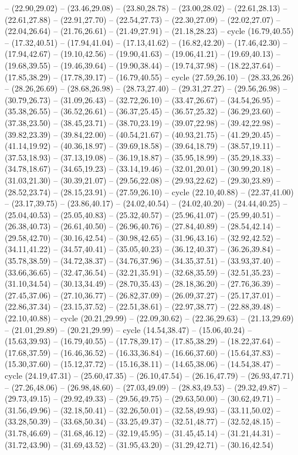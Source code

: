 {-- (22.90,29.02) -- (23.46,29.08) -- (23.80,28.78) -- (23.00,28.02) -- (22.61,28.13) -- (22.61,27.88) -- (22.91,27.70) -- (22.54,27.73) -- (22.30,27.09) -- (22.02,27.07) -- (22.04,26.64) -- (21.76,26.61) -- (21.49,27.91) -- (21.18,28.23) -- cycle (16.79,40.55) -- (17.32,40.51) -- (17.94,41.04) -- (17.13,41.62) -- (16.82,42.20) -- (17.46,42.30) -- (17.94,42.67) -- (19.10,42.56) -- (19.90,41.63) -- (19.06,41.21) -- (19.69,40.13) -- (19.68,39.55) -- (19.46,39.64) -- (19.90,38.44) -- (19.74,37.98) -- (18.22,37.64) -- (17.85,38.29) -- (17.78,39.17) -- (16.79,40.55) -- cycle (27.59,26.10) -- (28.33,26.26) -- (28.26,26.69) -- (28.68,26.98) -- (28.73,27.40) -- (29.31,27.27) -- (29.56,26.98) -- (30.79,26.73) -- (31.09,26.43) -- (32.72,26.10) -- (33.47,26.67) -- (34.54,26.95) -- (35.38,26.55) -- (36.52,26.61) -- (36.37,25.45) -- (36.57,25.32) -- (36.29,23.60) -- (37.38,23.50) -- (38.45,23.71) -- (38.70,23.19) -- (39.07,22.98) -- (39.42,22.98) -- (39.82,23.39) -- (39.84,22.00) -- (40.54,21.67) -- (40.93,21.75) -- (41.29,20.45) -- (41.14,19.92) -- (40.36,18.97) -- (39.69,18.58) -- (39.64,18.79) -- (38.57,19.11) -- (37.53,18.93) -- (37.13,19.08) -- (36.19,18.87) -- (35.95,18.99) -- (35.29,18.33) -- (34.78,18.67) -- (34.65,19.23) -- (33.14,19.46) -- (32.01,20.01) -- (30.99,20.18) -- (31.03,21.30) -- (30.39,21.07) -- (29.56,22.08) -- (29.93,22.62) -- (29.30,23.89) -- (28.52,23.74) -- (28.15,23.91) -- (27.59,26.10) -- cycle (22.10,40.88) -- (22.37,41.00) -- (23.17,39.75) -- (23.86,40.17) -- (24.02,40.54) -- (24.02,40.20) -- (24.44,40.25) -- (25.04,40.53) -- (25.05,40.83) -- (25.32,40.57) -- (25.96,41.07) -- (25.99,40.51) -- (26.38,40.73) -- (26.61,40.50) -- (26.96,40.76) -- (27.84,40.89) -- (28.54,42.14) -- (29.58,42.70) -- (30.16,42.54) -- (30.98,42.65) -- (31.96,43.16) -- (32.92,42.52) -- (34.11,41.22) -- (34.57,40.41) -- (35.05,40.23) -- (36.12,40.37) -- (36.26,39.84) -- (35.78,38.59) -- (34.72,38.37) -- (34.76,37.96) -- (34.35,37.51) -- (33.93,37.40) -- (33.66,36.65) -- (32.47,36.54) -- (32.21,35.91) -- (32.68,35.59) -- (32.51,35.23) -- (31.10,34.54) -- (30.13,34.49) -- (28.70,35.43) -- (28.18,36.20) -- (27.76,36.39) -- (27.45,37.06) -- (27.10,36.77) -- (26.82,37.09) -- (26.09,37.27) -- (25.17,37.01) -- (22.86,37.34) -- (23.15,37.52) -- (22.51,38.61) -- (22.97,38.77) -- (22.88,39.48) -- (22.10,40.88) -- cycle (20.21,29.99) -- (22.09,30.62) -- (22.36,29.63) -- (21.13,29.69) -- (21.01,29.89) -- (20.21,29.99) -- cycle (14.54,38.47) -- (15.06,40.24) -- (15.63,39.93) -- (16.79,40.55) -- (17.78,39.17) -- (17.85,38.29) -- (18.22,37.64) -- (17.68,37.59) -- (16.46,36.52) -- (16.33,36.84) -- (16.66,37.60) -- (15.64,37.83) -- (15.30,37.60) -- (15.12,37.72) -- (15.16,38.11) -- (14.65,38.06) -- (14.54,38.47) -- cycle (24.19,47.31) -- (25.60,47.35) -- (26.10,47.54) -- (26.16,47.79) -- (26.93,47.71) -- (27.26,48.06) -- (26.98,48.60) -- (27.03,49.09) -- (28.83,49.53) -- (29.32,49.87) -- (29.73,49.15) -- (29.92,49.33) -- (29.56,49.75) -- (29.63,50.00) -- (30.62,49.71) -- (31.56,49.96) -- (32.18,50.41) -- (32.26,50.01) -- (32.58,49.93) -- (33.11,50.02) -- (33.28,50.39) -- (33.68,50.34) -- (33.25,49.37) -- (32.51,48.77) -- (32.52,48.15) -- (31.78,46.69) -- (31.68,46.12) -- (32.19,45.95) -- (31.45,45.14) -- (31.21,44.31) -- (31.72,43.90) -- (31.69,43.52) -- (31.95,43.20) -- (31.29,42.71) -- (30.16,42.54) }
